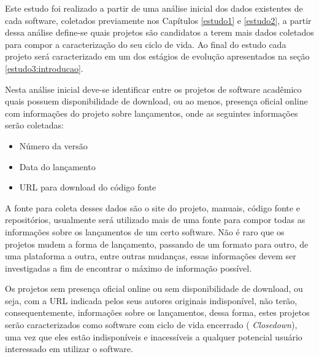 Este estudo foi realizado a partir de uma análise inicial dos dados existentes
de cada software, coletados previamente nos Capítulos \ref{estudo1} e
\ref{estudo2}, a partir dessa análise define-se quais projetos são candidatos a
terem mais dados coletados para compor a caracterização do seu ciclo de vida. Ao
final do estudo cada projeto será caracterizado em um dos estágios
de evolução apresentados na seção \ref{estudo3:introducao}.

Nesta análise inicial deve-se identificar entre os projetos de software
acadêmico quais possuem disponibilidade de download, ou ao menos, presença
oficial online com informações do projeto sobre lançamentos, onde as seguintes
informações serão coletadas:

\begin{itemize}
  \item Número da versão
  \item Data do lançamento
  \item URL para download do código fonte
\end{itemize}

A fonte para coleta desses dados são o site do projeto, manuais, código fonte e
repositórios, usualmente será utilizado mais de uma fonte para compor todas as
informações sobre os lançamentos de um certo software. Não é raro que os
projetos mudem a forma de lançamento, passando de um formato para outro, de uma
plataforma a outra, entre outras mudanças, essas informações devem ser
investigadas a fim de encontrar o máximo de informação possível.


Os projetos sem presença oficial online ou sem disponibilidade de download, ou
seja, com a URL indicada pelos seus autores originais indisponível,
não terão, consequentemente, informações sobre os lançamentos, dessa forma, estes
projetos serão caracterizados como software com ciclo de vida encerrado ({\it
Closedown}), uma vez que eles estão indisponíveis e inacessíveis a qualquer
potencial usuário interessado em utilizar o software.


